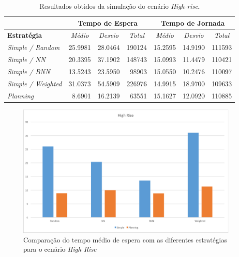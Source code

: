 \begin{table}[htb!]
\centering
\caption{Resultados obtidos da simulação do cenário \textit{High-rise}.}
\label{tab:results:highrise}
\begin{tabular}{|l|r|r|r|r|r|r|}
\hline
\multicolumn{1}{|c|}{\textbf{}}                 & \multicolumn{3}{c|}{\textbf{Tempo de Espera}}                                                                    & \multicolumn{3}{c|}{\textbf{Tempo de Jornada}}                                                                                                                       \\ \hline
\textbf{Estratégia} & \multicolumn{1}{c|}{\textit{Médio}} & \multicolumn{1}{c|}{\textit{Desvio}} & \multicolumn{1}{c|}{\textit{Total}} & \multicolumn{1}{c|}{\textit{Médio}}                   & \multicolumn{1}{c|}{\textit{Desvio}}                  & \multicolumn{1}{c|}{\textit{Total}}                  \\ \hline
\textit{Simple / Random}          & 25.9981 & 28.0464 & 190124 & 15.2595 & 14.9190 & 111593 \\ \hline
\textit{Simple / NN}              & 20.3395 & 37.1902 & 148743 & 15.0993 & 11.4479 & 110421 \\ \hline
\textit{Simple / BNN}             & 13.5243 & 23.5950 &  98903 & 15.0550 & \cellcolor[HTML]{67FD9A}10.2476 & 110097 \\ \hline
\textit{Simple / Weighted}        & 31.0373 & 54.5909 & 226976 & \cellcolor[HTML]{67FD9A}14.9915 & 18.9700 & \cellcolor[HTML]{67FD9A}109633 \\ \hline
\textit{Planning}                 &  \cellcolor[HTML]{67FD9A}8.6901 & \cellcolor[HTML]{67FD9A}16.2139 &  \cellcolor[HTML]{67FD9A}63551 & 15.1627 & 12.0920 & 110885 \\ \hline
\end{tabular}
\end{table}

\begin{figure}[htb]
  \centering
  \includegraphics[scale=0.5]{img/chart-averages-high-rise}
  \caption{Comparação do tempo médio de espera com as diferentes estratégias
    para o cenário \textit{High Rise}}
  \label{fig:result:average:high-rise}
\end{figure}

